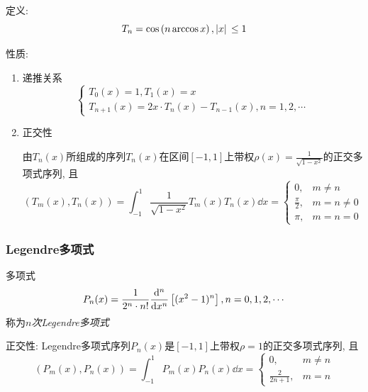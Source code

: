 定义:
\begin{equation*}
    T_n=\cos\left(n\arccos{x}\right),\abs*{x}\le 1
\end{equation*}

性质:

\begin{enumerate}
    \item 递推关系
    \begin{equation*}
        \begin{cases}
            T_0(x)=1, T_1(x)=x\\
            T_{n+1}(x)=2x\cdot T_n(x)-T_{n-1}(x), n=1,2,\cdots
        \end{cases}
    \end{equation*}

    \item 正交性
    
    由$T_n(x)$所组成的序列${T_n(x)}$在区间$[-1,1]$上带权$\rho(x)=\frac{1}{\sqrt{1-x^2}}$的正交多项式序列, 且
    \begin{equation*}
        (T_m(x),T_n(x))=\int_{-1}^1\frac{1}{\sqrt{1-x^2}}T_m(x)T_n(x)\dd{x}=
        \begin{cases}
            0,&m\ne n\\
            \frac{\pi}{2},&m=n\ne 0\\
            \pi,&m=n=0
        \end{cases}
    \end{equation*}
\end{enumerate}

\subsubsection{Legendre多项式}

\begin{definition}[$n$次Legendre多项式]
    多项式
    \begin{equation*}
        P_n(x)=\frac{1}{2^n\cdot n!}\dv[n]{x}\left[(x^2-1)^n\right], n=0,1,2,\cdots
    \end{equation*}
    称为\emph{$n$次Legendre多项式}
\end{definition}

正交性: Legendre多项式序列${P_n(x)}$是$[-1,1]$上带权$\rho=1$的正交多项式序列, 且
\begin{equation*}
    (P_m(x),P_n(x))=\int_{-1}^1P_m(x)P_n(x)\dd{x}=
    \begin{cases}
        0,&m\ne n\\
        \frac{2}{2n+1},& m=n
    \end{cases}
\end{equation*}

